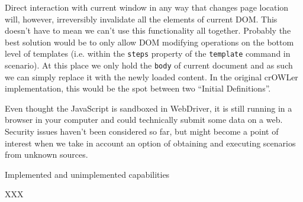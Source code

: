 Direct interaction with current window in any way that changes page location
will, however, irreversibly invalidate all the elements of current DOM. This
doesn't have to mean we can't use this functionality all together. Probably the
best solution would be to only allow DOM modifying operations on the bottom
level of templates (i.e. within the {\tt steps} property of the {\tt template}
command in scenario). At this place we only hold the {\tt body} of current
document and as such we can simply replace it with the newly loaded content. 
In the original crOWLer implementation, this would be the spot between two
``Initial Definitions''. 

Even thought the JavaScript is sandboxed in WebDriver, it is still running in a
browser in your computer and could technically submit some data on a web.
Security issues haven't been considered so far, but might become a point of
interest when we take in account an option of obtaining and executing scenarios
from unknown sources. 


\secc Implemented and unimplemented capabilities

XXX

